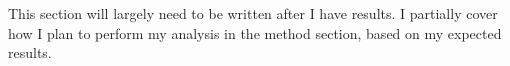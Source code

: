 
\par
This section will largely need to be written after I have results.
I partially cover how I plan to perform my analysis in the method section, based on my expected results.